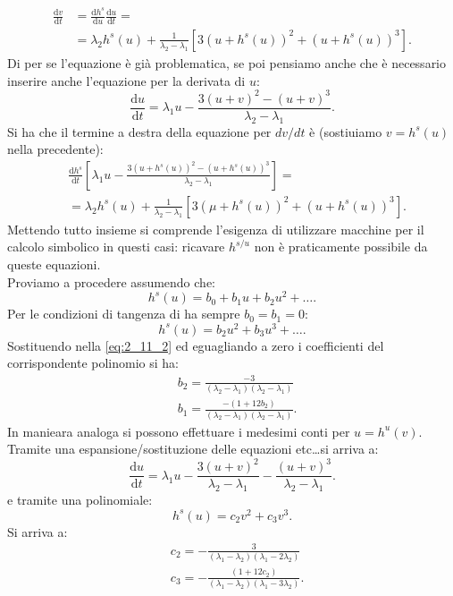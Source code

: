 \begin{exmp}
    \[\begin{aligned}
	\frac{\text{d} v}{\text{d} t} &= \frac{\text{d} h^s}{\text{d} u}  \frac{\text{d} u}{\text{d} t} = \\
				      &=\lambda_2h^s(u) + \frac{1}{\lambda_2-\lambda_1}\left[3(u + h^s(u))^2 + (u + h^s(u)) ^3\right]
    .\end{aligned}\]
    Di per se l'equazione è già problematica, se poi pensiamo anche che è necessario inserire anche l'equazione per la derivata di $u$: 
    \[
        \frac{\text{d} u}{\text{d} t} = \lambda_1u - \frac{3(u + v)^2 - (u + v)^3}{\lambda_2-\lambda_1}
    .\] 
    Si ha che il termine a destra della equazione per $dv / dt$ è (sostiuiamo $v = h^s(u)$ nella precedente):
    \begin{equation}
    \begin{aligned}
	&\frac{\text{d} h^s}{\text{d} t} \left[\lambda_1u - \frac{3(u + h^s(u))^2 - (u + h^s(u))^3}{\lambda_2-\lambda_1}\right]=\\
	&=\lambda_2 h^s(u) + \frac{1}{\lambda_2-\lambda_1}\left[3(\mu + h^s(u))^2 + (u + h^s(u))^3\right]
    .\end{aligned}
    \label{eq:2_11_2}
    \end{equation}
    Mettendo tutto insieme si comprende l'esigenza di utilizzare macchine per il calcolo simbolico in questi casi: ricavare $h^{s /u}$ non è praticamente possibile da queste equazioni.\\
    Proviamo a procedere assumendo che:
    \[
	h^s(u) = b_0 + b_1u + b_2 u^2 + \ldots
    .\] 
    Per le condizioni di tangenza di ha sempre $b_0=b_1=0$:
    \[
	h^s(u) = b_2u^2 + b_3 u ^3 + \ldots
    .\] 
    Sostituendo nella \ref{eq:2_11_2} ed eguagliando a zero i coefficienti del corrispondente polinomio si ha:
    \[\begin{aligned}
	&b_2 = \frac{-3}{(\lambda_2-\lambda_1) (\lambda_2-\lambda_1)}\\
	&b_1 = \frac{-(1+12b_2)}{(\lambda_2-\lambda_1) (\lambda_2-\lambda_1)}
    .\end{aligned}\]
    In manieara analoga si possono effettuare i medesimi conti per $u = h^u(v)$. Tramite una espansione/sostituzione delle equazioni etc\ldots si arriva a:
    \[
	\frac{\text{d} u}{\text{d} t} = \lambda_1u - \frac{3(u + v)^2}{\lambda_2-\lambda_1}- \frac{(u + v)^3}{\lambda_2-\lambda_1}
    .\] 
    e tramite una polinomiale:
    \[
	h^s(u) = c_2v^2 + c_3v^3
    .\] 
    Si arriva a:
    \[\begin{aligned}
	&c_2 = - \frac{3}{(\lambda_1-\lambda_2)(\lambda_1-2\lambda_2) }\\
	&c_3 = - \frac{(1 + 12 c_2) }{(\lambda_1-\lambda_2) (\lambda_1-3\lambda_2) }
    .\end{aligned}\]
\end{exmp}
\noindent
